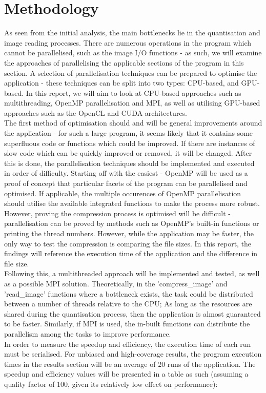 \documentclass[12pt, a4paper]{article}
\begin{document}
\section{Methodology}
As seen from the initial analysis, the main bottlenecks lie in the quantisation and image reading processes. There are numerous operations in the program which cannot be parallelised, such as the image I/O functions - as such, we will examine the approaches of parallelising the applicable sections of the program in this section. A selection of parallelisation techniques can be prepared to optimise the application - these techniques can be split into two types: CPU-based, and GPU-based. In this report, we will aim to look at CPU-based approaches such as multithreading, OpenMP parallelisation and MPI, as well as utilising GPU-based approaches such as the OpenCL and CUDA architectures. \\
The first method of optimisation should and will be general improvements around the application - for such a large program, it seems likely that it contains some superfluous code or functions which could be improved. If there are instances of slow code which can be quickly improved or removed, it will be changed. After this is done, the parallelisation techniques should be implemented and executed in order of difficulty. Starting off with the easiest - OpenMP will be used as a proof of concept that particular facets of the program can be parallelised and optimised. If applicable, the multiple occurences of OpenMP parallelisation should utilise the available integrated functions to make the process more robust. However, proving the compression process is optimised will be difficult - parallelisation can be proved by methods such as OpenMP's built-in functions or printing the thread numbers. However, while the application may be faster, the only way to test the compression is comparing the file sizes. In this report, the findings will reference the execution time of the application and the difference in file size. \\
Following this, a multithreaded approach will be implemented and tested, as well as a possible MPI solution. Theoretically, in the 'compress\_image' and 'read\_image' functions where a bottleneck exists, the task could be distributed between a number of threads relative to the CPU; As long as the resources are shared during the quantisation process, then the application is almost guaranteed to be faster. Similarly, if MPI is used, the in-built functions can distribute the parallelism among the tasks to improve performance. \\
In order to measure the speedup and efficiency, the execution time of each run must be serialised. For unbiased and high-coverage results, the program execution times in the results section will be an average of 20 runs of the application. The speedup and efficiency values will be presented in a table as such (assuming a quality factor of 100, given its relatively low effect on performance): \\
\end{document}
